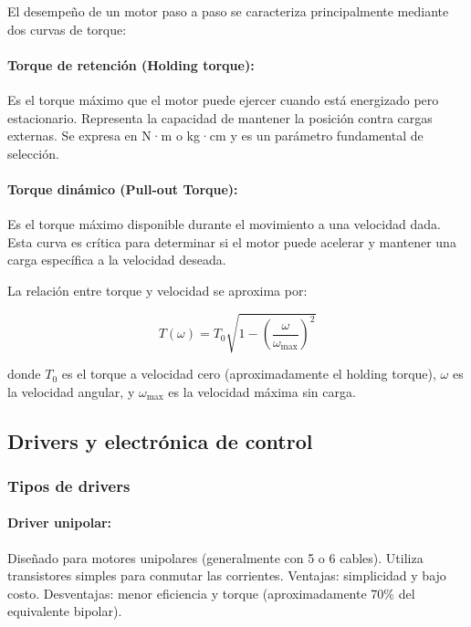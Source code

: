 El desempeño de un motor paso a paso se caracteriza principalmente mediante dos curvas de torque:

\paragraph{Torque de retención (Holding torque):}

Es el torque máximo que el motor puede ejercer cuando está energizado pero estacionario. Representa la capacidad de mantener la posición contra cargas externas. Se expresa en N·m o kg·cm y es un parámetro fundamental de selección.

\paragraph{Torque dinámico (Pull-out Torque):}

Es el torque máximo disponible durante el movimiento a una velocidad dada. Esta curva es crítica para determinar si el motor puede acelerar y mantener una carga específica a la velocidad deseada.

La relación entre torque y velocidad se aproxima por:

\begin{equation}
T(\omega) = T_0 \sqrt{1 - \left(\frac{\omega}{\omega_{\max}}\right)^2}
\end{equation}

donde $T_0$ es el torque a velocidad cero (aproximadamente el holding torque), $\omega$ es la velocidad angular, y $\omega_{\max}$ es la velocidad máxima sin carga.

\subsection{Drivers y electrónica de control}

\subsubsection{Tipos de drivers}

\paragraph{Driver unipolar:}

Diseñado para motores unipolares (generalmente con 5 o 6 cables). Utiliza transistores simples para conmutar las corrientes. Ventajas: simplicidad y bajo costo. Desventajas: menor eficiencia y torque (aproximadamente 70\% del equivalente bipolar).

